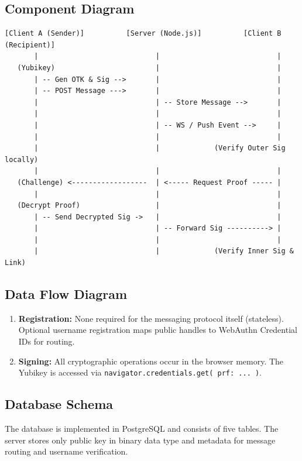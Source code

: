 \documentclass[letterpaper,11pt]{article}
\begin{document}
\subsection{Component Diagram}
\begin{verbatim}
[Client A (Sender)]          [Server (Node.js)]          [Client B (Recipient)]
       |                            |                            |
   (Yubikey)                        |                            |
       | -- Gen OTK & Sig -->       |                            |
       | -- POST Message --->       |                            |
       |                            | -- Store Message -->       |
       |                            |                            |
       |                            | -- WS / Push Event -->     |
       |                            |                            |
       |                            |             (Verify Outer Sig locally)
       |                            |                            |
   (Challenge) <------------------  | <----- Request Proof ----- |
       |                            |                            |
   (Decrypt Proof)                  |                            |
       | -- Send Decrypted Sig ->   |                            |
       |                            | -- Forward Sig ----------> |
       |                            |                            |
       |                            |             (Verify Inner Sig & Link)
\end{verbatim}

\subsection{Data Flow Diagram}
\begin{enumerate}
    \item \textbf{Registration:} None required for the messaging protocol itself (stateless). Optional username registration maps public handles to WebAuthn Credential IDs for routing.
    \item \textbf{Signing:} All cryptographic operations occur in the browser memory. The Yubikey is accessed via \texttt{navigator.credentials.get( prf: ... )}.
\end{enumerate}

\subsection{Database Schema}
The database is implemented in PostgreSQL and consists of five tables. The server stores only public key in binary data type and metadata for message routing and username verification.
\end{document}

